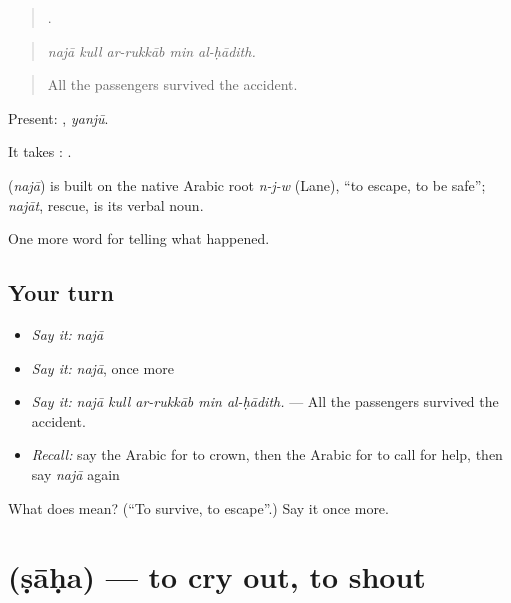 \begin{quote}
    .
\end{quote}

\begin{quote}
\emph{najā kull ar-rukkāb min al-ḥādith.}
\end{quote}

\begin{quote}
All the passengers survived the accident.
\end{quote}

Present: , \emph{yanjū}.

It takes :   .

\begin{cousinweb}
\textbf{} (\emph{najā}) is built on the native Arabic root \emph{n-j-w} (Lane), \textquotedblleft{}to escape, to be safe\textquotedblright{}; \emph{najāt}, rescue, is its verbal noun.
\end{cousinweb}

\begin{grammarlens}[title={What you've built}]
One more word for telling what happened.
\end{grammarlens}

\subsection*{Your turn}
\begin{itemize}
\raggedright
  \item \emph{Say it:} \emph{najā}
  \item \emph{Say it:} \emph{najā}, once more
  \item \emph{Say it:} \emph{najā kull ar-rukkāb min al-ḥādith.} — All the passengers survived the accident.
  \item \emph{Recall:} say the Arabic for to crown, then the Arabic for to call for help, then say \emph{najā} again
\end{itemize}

\begin{tcolorbox}[breakable,colback=teal!4,colframe=teal!35!black,title={Before you move on}]
What does  mean? (\textquotedblleft{}To survive, to escape\textquotedblright{}.) Say it once more.
\end{tcolorbox}
\section[\texorpdfstring{\ar{صاح} (ṣāḥa)}{صاح (ṣāḥa)}]{ (ṣāḥa) — to cry out, to shout}

